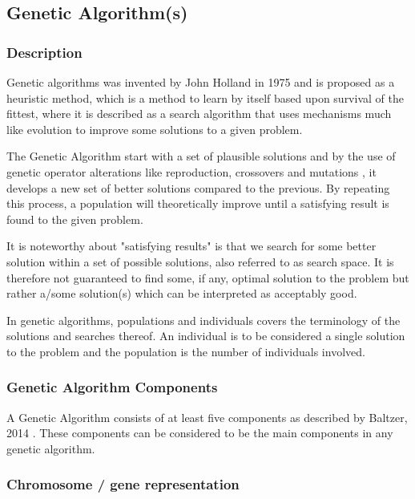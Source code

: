 \subsection{Genetic Algorithm(s)}\label{ssec:ga}

\subsubsection{Description}
Genetic algorithms was invented by John Holland in 1975 and is proposed as a heuristic method, which is a method to learn by itself based upon survival of the fittest, where it is described as a  search algorithm that uses mechanisms much like evolution to improve some solutions to a given problem. \cite[pp. 20]{Sivanandam2008}

The Genetic Algorithm start with a set of plausible solutions and by the use of genetic operator alterations like reproduction, crossovers and mutations \cite{Baltzer2014}, it develops a new set of better solutions compared to the previous. By repeating this process, a population will theoretically improve until a satisfying result is found to the given problem. \cite{BCS2013}

It is noteworthy about "satisfying results" is that we search for some better solution within a set of possible solutions, also referred to as search space. It is therefore not guaranteed to find some, if any, optimal solution to the problem but rather a/some solution(s) which can be interpreted as acceptably good. \cite[pp. 20/21]{Sivanandam2008}


In genetic algorithms, populations and individuals covers the terminology of the solutions and searches thereof. An individual is to be considered a single solution to the problem and the population is the number of individuals involved. \cite[pp. 39]{Sivanandam2008}



\subsubsection{Genetic Algorithm Components}

A Genetic Algorithm consists of at least five components as described by Baltzer, 2014 \cite{Baltzer2014}. These components can be considered to be the main components in any genetic algorithm.


\subsubsection*{Chromosome / gene representation}

